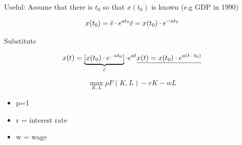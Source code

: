 \documentclass[
  letterpaper,
  DIV=11,
  numbers=noendperiod]{scrartcl}
\providecommand{\tightlist}{%
  \setlength{\itemsep}{0pt}\setlength{\parskip}{0pt}}
\begin{document}
Useful: Assume that there is \(t_0\) so that \(x(t_0)\) is known (e.g
GDP in 1990)

\[
x(t_0) = \bar{c}\cdot e^{at_0} \\
\bar{c} = x(t_0) \cdot e^{-at_0}
\]

Substitute

\[
x(t) = \underbrace{[x(t_0) \cdot e^{-at_0}]}_{\bar{c}} \cdot e^{at} \\
\underline{x(t) = x(t_0) \cdot e^{a(t-t_0)}}
\]

\[
\max_{K,L} p F(K,L) - rK - wL
\]

\begin{itemize}
\tightlist
\item
  p=1
\item
  r = interest rate
\item
  w = wage
\end{itemize}
\end{document}
